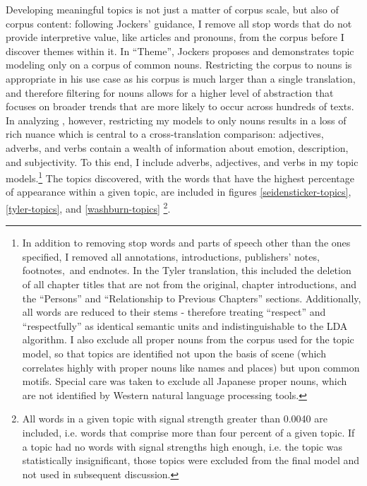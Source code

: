 \documentclass[12pt]{article}
\begin{document}
\begin{flushleft}
\begin{spacing}{2.0}
Developing meaningful topics is not just a matter of corpus scale, but also of corpus content: following Jockers' guidance, I remove all stop words that do not provide interpretive value, like articles and pronouns, from the corpus before I discover themes within it. In ``Theme'', Jockers proposes and demonstrates topic modeling only on a corpus of common nouns. Restricting the corpus to nouns is appropriate in his use case as his corpus is much larger than a single  translation, and therefore filtering for nouns allows for a higher level of abstraction that focuses on broader trends that are more likely to occur across hundreds of texts. In analyzing , however, restricting my models to only nouns results in a loss of rich nuance which is central to a cross-translation comparison: adjectives, adverbs, and verbs contain a wealth of information about emotion, description, and subjectivity. To this end, I include adverbs, adjectives, and verbs in my topic models.\footnote{ In addition to removing stop words and parts of speech other than the ones specified, I removed all annotations, introductions, publishers' notes, footnotes, and endnotes. In the Tyler translation, this included the deletion of all chapter titles that are not from the original, chapter introductions, and the ``Persons'' and ``Relationship to Previous Chapters'' sections. Additionally, all words are reduced to their stems - therefore treating ``respect'' and ``respectfully'' as identical semantic units and indistinguishable to the LDA algorithm. I also exclude all proper nouns from the corpus used for the topic model, so that topics are identified not upon the basis of scene (which correlates highly with proper nouns like names and places) but upon common motifs. Special care was taken to exclude all Japanese proper nouns, which are not identified by Western natural language processing tools.} The topics discovered, with the words that have the highest percentage of appearance within a given topic, are included in figures \ref{seidensticker-topics}, \ref{tyler-topics}, and \ref{washburn-topics} \footnote{All words in a given topic with signal strength greater than 0.0040 are included, i.e. words that comprise more than four percent of a given topic. If a topic had no words with signal strengths high enough, i.e. the topic was statistically insignificant, those topics were excluded from the final model and not used in subsequent discussion.}.


\end{spacing}
\end{flushleft}
\end{document}
